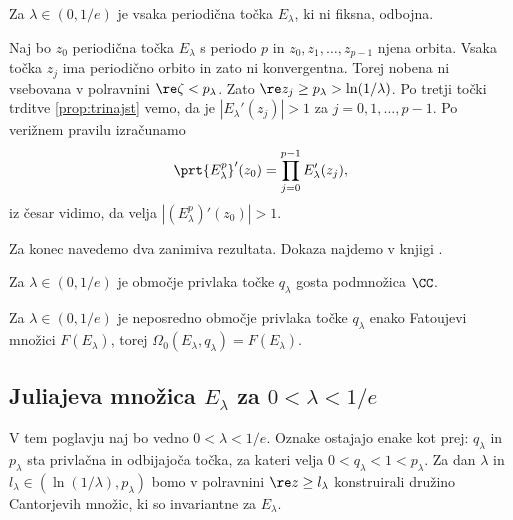 \begin{posledica}
    Za \(\lambda \in (0, 1/e)\) je vsaka periodična točka \(E_\lambda\), ki ni fiksna, odbojna.
\end{posledica}

\begin{dokaz}
    Naj bo \(z_0\) periodična točka \(E_\lambda\) s periodo \(p\) in \(z_0, z_1, \dots, z_{p - 1}\) njena orbita. Vsaka točka \(z_j\) ima periodično orbito in zato ni konvergentna. Torej nobena ni vsebovana v polravnini \(\re \zeta < p_\lambda\). Zato \(\re z_j \geq p_\lambda > \ln (1 / \lambda)\). Po tretji točki trditve \ref{prop:trinajst} vemo, da je \(|E_\lambda' (z_j)| > 1\) za \(j = 0, 1, \dots, p - 1\). Po verižnem pravilu izračunamo
    \[\prt{E_\lambda^p}' (z_0) = \prod_{j = 0}^{p - 1} E_\lambda' (z_j),\]
    iz česar vidimo, da velja \(|(E_\lambda^p)' (z_0)| > 1\).
\end{dokaz}

Za konec navedemo dva zanimiva rezultata. Dokaza najdemo v knjigi \cite[trditev 9.1.7, izrek 9.1.8]{Pineiro_2025}.

\begin{trditev}
    Za \(\lambda \in (0, 1/e)\) je območje privlaka točke \(q_\lambda\) gosta podmnožica \(\CC\).
\end{trditev}

\begin{izrek}
    Za \(\lambda \in (0, 1/e)\) je neposredno območje privlaka točke \(q_\lambda\) enako Fatoujevi množici \(F (E_\lambda)\), torej \(\Omega_0 (E_\lambda, q_\lambda) = F (E_\lambda)\).
\end{izrek}

\subsection{Juliajeva množica \texorpdfstring{\(E_\lambda\)}{E\_\lambda} za \texorpdfstring{\(0 < \lambda < 1/e\)}{0 < \lambda < 1/e}}

V tem poglavju naj bo vedno \(0 < \lambda < 1/e\). Oznake ostajajo enake kot prej: \(q_\lambda\) in \(p_\lambda\) sta privlačna in odbijajoča točka, za kateri velja \(0 < q_\lambda < 1 < p_\lambda\). Za dan \(\lambda\) in \(l_\lambda \in (\ln (1 / \lambda), p_\lambda)\) bomo v polravnini \(\re z \geq l_\lambda\) konstruirali družino Cantorjevih množic, ki so invariantne za \(E_\lambda\).

